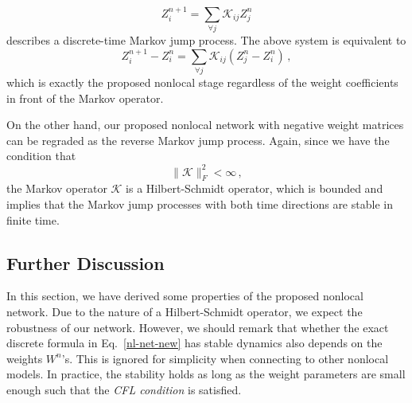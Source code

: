 \documentclass{article}
\begin{document}
\begin{equation}
Z^{n+1}_i = \sum_{\forall j} \mathcal{K}_{ij} Z^n_j
\end{equation}
describes a discrete-time Markov jump process. The above system is equivalent to
\begin{equation}
Z^{n+1}_i - Z^{n}_i = \sum_{\forall j} \mathcal{K}_{ij} \left( Z^n_j - Z^n_i \right)\,,
\end{equation}
 which is exactly the proposed nonlocal stage regardless of the weight coefficients in front of the Markov operator. %

On the other hand, our proposed nonlocal network with negative weight matrices can be regraded as the reverse Markov jump process. Again, since we have the condition that
\begin{equation}
\|\mathcal{K}\|_F^2 < \infty\,,
\end{equation}
the Markov operator $\mathcal{K}$ is a Hilbert-Schmidt operator, which is bounded and implies that the Markov jump processes with both time directions are stable in finite time.


\subsection{Further Discussion}\label{sec:disc}
In this section, we have derived some properties of the proposed nonlocal network. Due to the nature of a Hilbert-Schmidt operator, we expect the robustness of our network. However, we should remark that whether the exact discrete formula in Eq.~\eqref{nl-net-new} has stable dynamics also depends on the weights $W^n$'s. This is ignored for simplicity when connecting to other nonlocal models. In practice, the stability holds as long as the weight parameters are small enough such that the \textit{CFL condition} is satisfied. 
\end{document}
